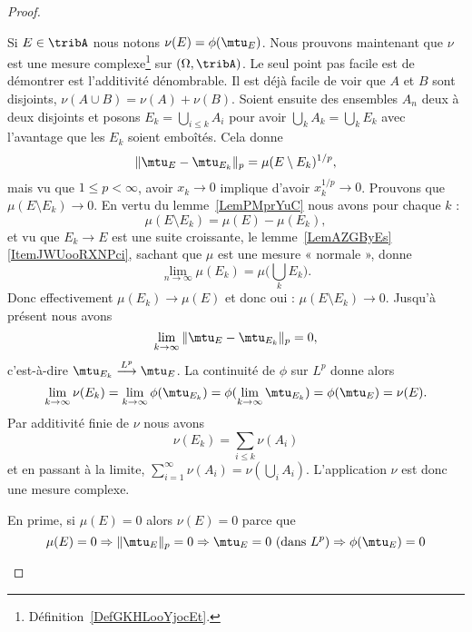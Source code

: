 \begin{proof}
\begin{subproof}
		Si \( E\in\tribA\) nous notons \( \nu(E)=\phi(\mtu_E)\). Nous prouvons maintenant que \( \nu\) est une mesure complexe\footnote{Définition~\ref{DefGKHLooYjocEt}.} sur \( (\Omega,\tribA)\). Le seul point pas facile est de démontrer est l'additivité dénombrable. Il est déjà facile de voir que \( A\) et \( B\) sont disjoints, \( \nu(A\cup B)=\nu(A)+\nu(B)\). Soient ensuite des ensembles \( A_n\) deux à deux disjoints et posons \( E_k=\bigcup_{i\leq k}A_i\) pour avoir \( \bigcup_kA_k=\bigcup_kE_k\) avec l'avantage que les \( E_k\) soient emboîtés. Cela donne
		\begin{equation}
			\| \mtu_E-\mtu_{E_k} \|_p=\mu(E\setminus E_k)^{1/p},
		\end{equation}
		mais vu que \( 1\leq p<\infty\), avoir \( x_k\to 0\) implique d'avoir \( x_k^{1/p}\to 0\). Prouvons que \( \mu(E\setminus E_k)\to 0\). En vertu du lemme~\ref{LemPMprYuC} nous avons pour chaque \( k\) :
		\begin{equation}
			\mu(E\setminus E_k)=\mu(E)-\mu(E_k),
		\end{equation}
		et vu que \( E_k\to E\) est une suite croissante, le lemme~\ref{LemAZGByEs}\ref{ItemJWUooRXNPci}, sachant que \( \mu\) est une mesure « normale », donne
		\begin{equation}
			\lim_{n\to \infty} \mu(E_k)=\mu\big( \bigcup_kE_k \big).
		\end{equation}
		Donc effectivement \( \mu(E_k)\to \mu(E)\) et donc oui : \( \mu(E\setminus E_k)\to 0\). Jusqu'à présent nous avons
		\begin{equation}
			\lim_{k\to \infty} \| \mtu_E-\mtu_{E_k} \|_p=0,
		\end{equation}
		c'est-à-dire \( \mtu_{E_k}\stackrel{L^p}{\longrightarrow}\mtu_E\). La continuité de \( \phi\) sur \( L^p\) donne alors
		\begin{equation}
			\lim_{k\to \infty} \nu(E_k)=\lim_{k\to \infty} \phi(\mtu_{E_k})=\phi(\lim_{k\to \infty} \mtu_{E_k})=\phi(\mtu_E)=\nu(E).
		\end{equation}
		Par additivité finie de \( \nu\) nous avons
		\begin{equation}
			\nu(E_k)=\sum_{i\leq k}\nu(A_i)
		\end{equation}
		et en passant à la limite, \( \sum_{i=1}^{\infty}\nu(A_i)=\nu(\bigcup_{i}A_i)\). L'application \( \nu\) est donc une mesure complexe.


		En prime, si \( \mu(E)=0\) alors \( \nu(E)=0\) parce que
		\begin{equation}
			\mu(E)=0\Rightarrow \| \mtu_E \|_p=0\Rightarrow \mtu_E=0\text{ (dans } L^p\text{)}\Rightarrow\phi(\mtu_E)=0
		\end{equation}


\end{subproof}
\end{proof}
